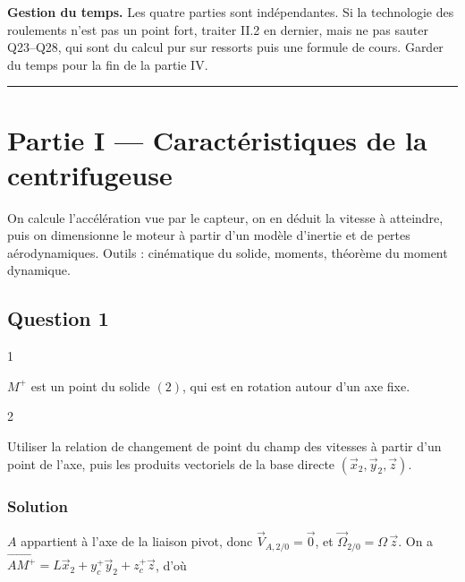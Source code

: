 \documentclass[11pt,a4paper]{article}
\begin{document}
\textbf{Gestion du temps.} Les quatre parties sont indépendantes. Si la technologie des roulements n'est pas un point fort, traiter II.2 en dernier, mais ne pas sauter Q23--Q28, qui sont du calcul pur sur ressorts puis une formule de cours. Garder du temps pour la fin de la partie IV.

\begin{center}\rule{0.5\linewidth}{0.5pt}\end{center}

\hypertarget{partie-i-caractuxe9ristiques-de-la-centrifugeuse}{%
\section{Partie I --- Caractéristiques de la centrifugeuse}\label{partie-i-caractuxe9ristiques-de-la-centrifugeuse}}

On calcule l'accélération vue par le capteur, on en déduit la vitesse à atteindre, puis on dimensionne le moteur à partir d'un modèle d'inertie et de pertes aérodynamiques. Outils : cinématique du solide, moments, théorème du moment dynamique.

\hypertarget{question-1}{%
\subsection{Question 1}\label{question-1}}

\begin{indication}{1}

\(M^+\) est un point du solide \((2)\), qui est en rotation autour d'un axe fixe.

\end{indication}

\begin{indication}{2}

Utiliser la relation de changement de point du champ des vitesses à partir d'un point de l'axe, puis les produits vectoriels de la base directe \((\vec x_2, \vec y_2, \vec z)\).

\end{indication}

\hypertarget{solution}{%
\subsubsection{Solution}\label{solution}}

\(A\) appartient à l'axe de la liaison pivot, donc \(\vec V_{A,2/0} = \vec 0\), et \(\vec\Omega_{2/0} = \Omega\,\vec z\). On a \(\vec{AM^+} = L\vec x_2 + y_c^+\vec y_2 + z_c^+\vec z\), d'où
\end{document}
